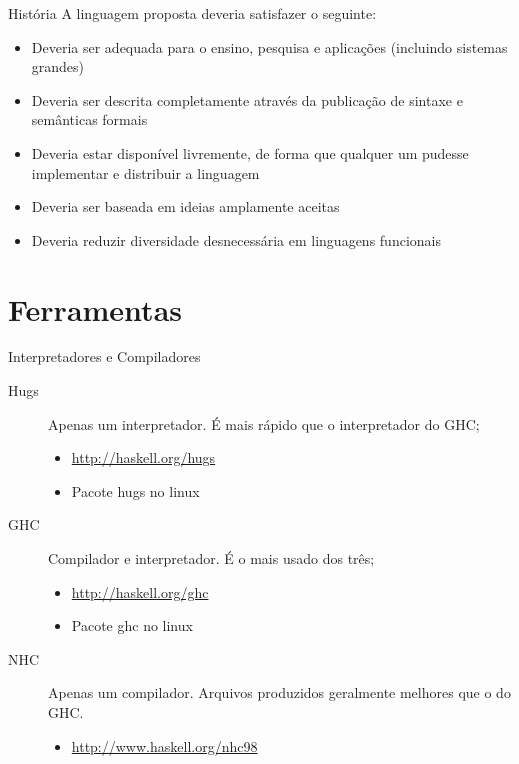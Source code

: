 \documentclass{beamer}
\begin{document}
	\begin{frame}{História}
	 A linguagem proposta deveria satisfazer o seguinte:
	 \begin{itemize}
	  \item Deveria ser adequada para o ensino, pesquisa e aplicações (incluindo sistemas grandes)
	  \item Deveria ser descrita completamente através da publicação de sintaxe e semânticas formais
	  \item Deveria estar disponível livremente, de forma que qualquer um pudesse implementar e distribuir a linguagem
	  \item Deveria ser baseada em ideias amplamente aceitas
	  \item Deveria reduzir diversidade desnecessária em linguagens funcionais
	 \end{itemize}
	\end{frame}
	
\section{Ferramentas}

	\begin{frame}{}
	\end{frame}

	\begin{frame}{Interpretadores e Compiladores}
	 
	 \begin{description}
	  \item [Hugs] Apenas um interpretador. É mais rápido que o interpretador do GHC;
			\begin{itemize}
			 \item \url{http://haskell.org/hugs}
			 \item Pacote hugs no linux
			\end{itemize}
	  \item [GHC] Compilador e interpretador. É o mais usado dos três;
			\begin{itemize}
			 \item \url{http://haskell.org/ghc}
			 \item Pacote ghc no linux
			\end{itemize}
	  \item [NHC] Apenas um compilador. Arquivos produzidos geralmente melhores que o do GHC.
			\begin{itemize}
			 \item \url{http://www.haskell.org/nhc98}
			\end{itemize}
	 \end{description}	 
	\end{frame}
	
\end{document}
